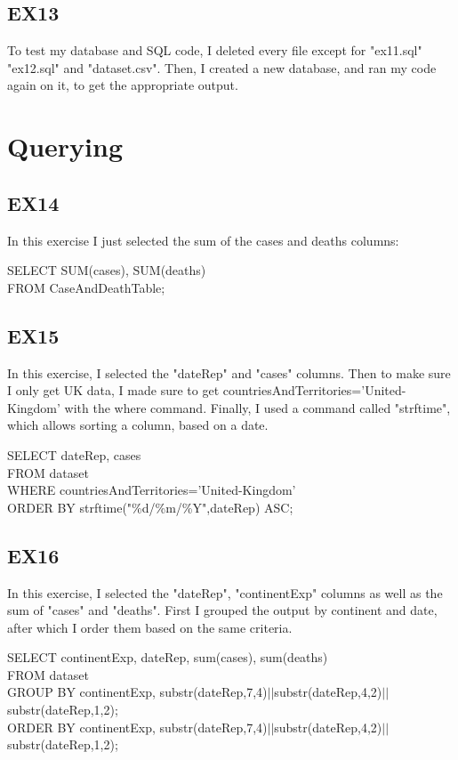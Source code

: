 \documentclass{article}
\begin{document}
\subsection{EX13}
To test my database and SQL code, I deleted every file except for "ex11.sql" "ex12.sql" and "dataset.csv". Then, I created a new database, and ran my code again on it, to get the appropriate output. 

\section{Querying}
\subsection{EX14}
In this exercise I just selected the sum of the cases and deaths columns:
\begin{algorithm}
SELECT SUM(cases), SUM(deaths) \\
FROM CaseAndDeathTable;
\end{algorithm}

\subsection{EX15}
In this exercise, I selected the "dateRep" and "cases" columns. Then to make sure I only get UK data, I made sure to get countriesAndTerritories='United-Kingdom' with the where command. Finally, I used a command called "strftime", which allows sorting a column, based on a date.
\begin{algorithm}
SELECT dateRep, cases \\
FROM dataset \\
WHERE countriesAndTerritories='United-Kingdom' \\
ORDER BY strftime("\%d/\%m/\%Y",dateRep) ASC;
\end{algorithm} \par

\subsection{EX16}
In this exercise, I selected the "dateRep", "continentExp" columns as well as the sum of "cases" and "deaths". First I grouped the output by continent and date, after which I order them based on the same criteria.
\begin{algorithm}
SELECT continentExp, dateRep, sum(cases), sum(deaths) \\
FROM dataset \\
GROUP BY continentExp, substr(dateRep,7,4)$||$substr(dateRep,4,2)$||$substr(dateRep,1,2); \\
ORDER BY continentExp, substr(dateRep,7,4)$||$substr(dateRep,4,2)$||$substr(dateRep,1,2); 
\end{algorithm} \newpage
\end{document}
